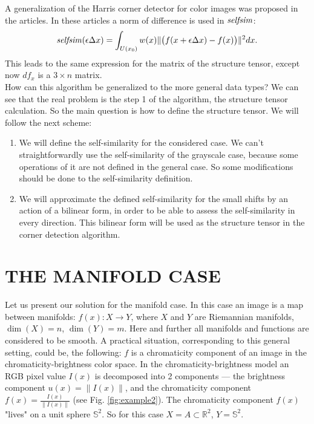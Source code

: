 \documentclass[a4paper,twoside]{article}
\newcommand{\selfsim}{\mathop{\it selfsim}}
\newcommand{\delx}{\Delta x}
\newcommand{\Rtwo}{{\mathbb{R}}^2}
\begin{document}
A generalization of the Harris corner detector for color images was proposed in the articles\cite{Montesinos98, Montesinos2000}. In these articles a norm of difference is used in $\selfsim$: 
$$\selfsim(\epsilon\delx) = \int_{U(x_0)} w(x) \|\big(f(x+\epsilon\delx) - f(x)\big)\|^2 dx.$$
This leads to the same expression for the matrix of the structure tensor, except now $df_x$ is a $3 \times n$ matrix.
\\
How can this algorithm be generalized to the more general data types? We can see that the real problem is the step 1 of the algorithm, the structure tensor calculation. So the main question is how to define the structure tensor. We will follow the next scheme:
\begin{enumerate}
\item We will define the self-similarity for the considered case. We can't straightforwardly use the self-similarity of the grayscale case, because some operations of it are not defined in the general case. So some modifications should be done to the self-similarity definition.
\item We will approximate the defined self-similarity for the small shifts by an action of a bilinear form, in order to be able to assess the self-similarity in every direction. This bilinear form will be used as the structure tensor in the corner detection algorithm.
\end{enumerate}

\section{\uppercase{The manifold case}}

\noindent Let us present our solution for the manifold case. In this case an image is a map between manifolds: $f(x): X \to Y$, where $X$ and $Y$ are Riemannian manifolds, $\dim(X) = n$, $\dim(Y) = m$. Here and further all manifolds and functions are considered to be smooth. A practical situation, corresponding to this general setting, could be, the following: $f$ is a chromaticity component of an image in the chromaticity-brightness color space\cite{SphereData3}. In the chromaticity-brightness model an RGB pixel value $I(x)$ is decomposed into 2 components --- the brightness component $u(x) = \|I(x)\|$, and the chromaticity component $f(x) = \frac{I(x)}{\|I(x)\|}$ (see Fig. \ref{fig:example2}). The chromaticity component $f(x)$ "lives" on a unit sphere $\mathbb{S}^2$. So for this case $X = A \subset \Rtwo$, $Y = \mathbb{S}^2$.
\end{document}
